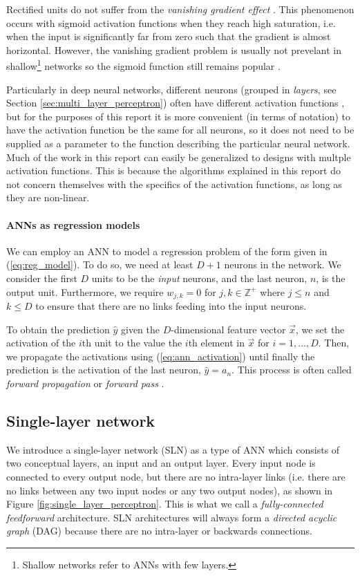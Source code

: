 Rectified units do not suffer from the \textit{vanishing gradient effect} \cite{glorot2011}.
This phenomenon occurs with sigmoid activation functions when they reach high saturation, i.e. when the input is significantly far from zero such that the gradient is almost horizontal.
However, the vanishing gradient problem is usually not prevelant in shallow\footnote{Shallow networks refer to ANNs with few layers.} networks so the sigmoid function still remains popular \cite{neal1992}.

Particularly in deep neural networks, different neurons (grouped in \textit{layers}, see Section \ref{sec:multi_layer_perceptron}) often have different activation functions \cite{burkov2019}, but for the purposes of this report it is more convenient (in terms of notation) to have the activation function be the same for all neurons, so it does not need to be supplied as a parameter to the function describing the particular neural network.
Much of the work in this report can easily be generalized to designs with multple activation functions.
This is because the algorithms explained in this report do not concern themselves with the specifics of the activation functions, as long as they are non-linear.

\paragraph{ANNs as regression models}
We can employ an ANN to model a regression problem of the form given in (\ref{eq:reg_model}). 
To do so, we need at least $D+1$ neurons in the network. 
We consider the first $D$ units to be the \textit{input} neurons, and the last neuron, $n$, is the output unit.
Furthermore, we require $w_{j,k}=0$ for $j,k \in \mathbb{Z}^+$ where $j \leq n$ and $k \leq D$ to ensure that there are no links feeding into the input neurons.

To obtain the prediction $\hat{y}$ given the $D$-dimensional feature vector $\vec{x}$, we set the activation of the $i$th unit to the value the $i$th element in $\vec{x}$ for $i=1,\dots,D$.
Then, we propagate the activations using (\ref{eq:ann_activation}) until finally the prediction is the activation of the last neuron, $\hat{y}=a_n$.
This process is often called \textit{forward propagation} or \textit{forward pass} \cite{burkov2019}.

\subsection{Single-layer network}
We introduce a single-layer network (SLN) as a type of ANN which consists of two conceptual layers, an input and an output layer.
Every input node is connected to every output node, but there are no intra-layer links (i.e. there are no links between any two input nodes or any two output nodes), as shown in Figure \ref{fig:single_layer_perceptron}. 
This is what we call a \textit{fully-connected feedforward} architecture.
SLN architectures will always form a \textit{directed acyclic graph} (DAG) because there are no intra-layer or backwards connections.

